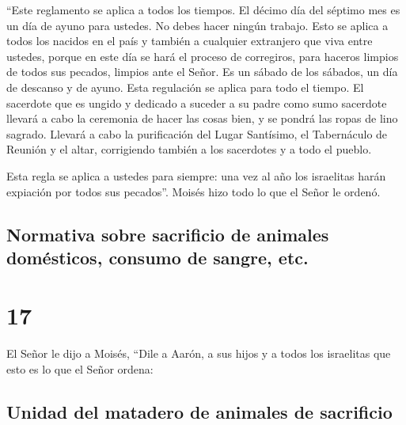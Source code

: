  ``Este reglamento se aplica a todos los tiempos. El
décimo día del séptimo mes es un día de ayuno para ustedes. No debes
hacer ningún trabajo. Esto se aplica a todos los nacidos en el país y
también a cualquier extranjero que viva entre ustedes, 
porque en este día se hará el proceso de corregiros, para haceros
limpios de todos sus pecados, limpios ante el Señor.  Es
un sábado de los sábados, un día de descanso y de ayuno. Esta regulación
se aplica para todo el tiempo.  El sacerdote que es
ungido y dedicado a suceder a su padre como sumo sacerdote llevará a
cabo la ceremonia de hacer las cosas bien, y se pondrá las ropas de lino
sagrado.  Llevará a cabo la purificación del Lugar
Santísimo, el Tabernáculo de Reunión y el altar, corrigiendo también a
los sacerdotes y a todo el pueblo.

 Esta regla se aplica a ustedes para siempre: una vez al
año los israelitas harán expiación por todos sus pecados''. Moisés hizo
todo lo que el Señor le ordenó.

\hypertarget{normativa-sobre-sacrificio-de-animales-domuxe9sticos-consumo-de-sangre-etc.}{%
\subsection{Normativa sobre sacrificio de animales domésticos, consumo
de sangre,
etc.}\label{normativa-sobre-sacrificio-de-animales-domuxe9sticos-consumo-de-sangre-etc.}}

\hypertarget{section-16}{%
\section{17}\label{section-16}}

 El Señor le dijo a Moisés,  ``Dile a Aarón,
a sus hijos y a todos los israelitas que esto es lo que el Señor ordena:

\hypertarget{unidad-del-matadero-de-animales-de-sacrificio}{%
\subsection{Unidad del matadero de animales de
sacrificio}\label{unidad-del-matadero-de-animales-de-sacrificio}}

